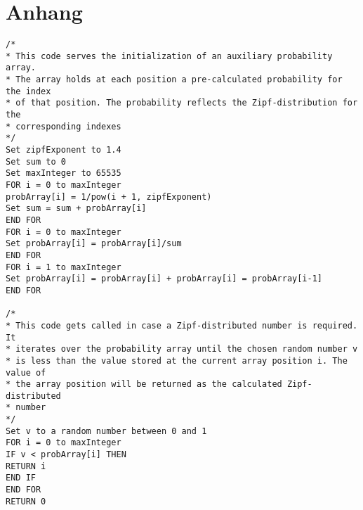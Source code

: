 %
%
\chapter{Anhang}\label{ch:anhang}
\small{
\begin{verbatim}
/*
* This code serves the initialization of an auxiliary probability array.
* The array holds at each position a pre-calculated probability for the index
* of that position. The probability reflects the Zipf-distribution for the
* corresponding indexes
*/
Set zipfExponent to 1.4
Set sum to 0
Set maxInteger to 65535
FOR i = 0 to maxInteger
probArray[i] = 1/pow(i + 1, zipfExponent)
Set sum = sum + probArray[i]
END FOR
FOR i = 0 to maxInteger
Set probArray[i] = probArray[i]/sum
END FOR
FOR i = 1 to maxInteger
Set probArray[i] = probArray[i] + probArray[i] = probArray[i-1]
END FOR

/*
* This code gets called in case a Zipf-distributed number is required. It
* iterates over the probability array until the chosen random number v
* is less than the value stored at the current array position i. The value of
* the array position will be returned as the calculated Zipf-distributed
* number
*/
Set v to a random number between 0 and 1
FOR i = 0 to maxInteger
IF v < probArray[i] THEN
RETURN i
END IF
END FOR
RETURN 0

\end{verbatim}
}
